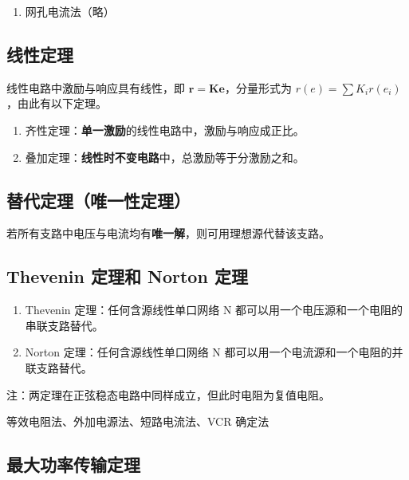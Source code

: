 \documentclass[UTF8,fontset=fandol,zihao=5]{ctexart}
\begin{document}
\begin{methodbox}[【方法】网孔电流法]
\begin{enumerate}[start=2]
  \item 网孔电流法（略）
\end{enumerate}
\end{methodbox}

\subsection{线性定理}

线性电路中激励与响应具有线性，即 \(\boldsymbol{r}=\boldsymbol{K}\boldsymbol{e}\)，分量形式为 \(r(e)=\displaystyle\sum K_i r(e_i)\)，由此有以下定理。

\begin{enumerate}
  \item 齐性定理：\textbf{单一激励}的线性电路中，激励与响应成正比。
  \item 叠加定理：\textbf{线性时不变电路}中，总激励等于分激励之和。
\end{enumerate}

\subsection{替代定理（唯一性定理）}

若所有支路中电压与电流均有\textbf{唯一解}，则可用理想源代替该支路。

\subsection{Thevenin 定理和 Norton 定理}

\begin{enumerate}
  \item Thevenin 定理：任何含源线性单口网络 N 都可以用一个电压源和一个电阻的串联支路替代。
  \item Norton 定理：任何含源线性单口网络 N 都可以用一个电流源和一个电阻的并联支路替代。
\end{enumerate}

注：两定理在正弦稳态电路中同样成立，但此时电阻为复值电阻。

\begin{methodbox}
  等效电阻法、外加电源法、短路电流法、VCR 确定法
\end{methodbox}

\subsection{最大功率传输定理}
\end{document}
